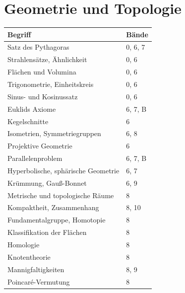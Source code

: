 \section*{Geometrie und Topologie}
\nopagebreak
{\small\renewcommand{\arraystretch}{1.32}
\begin{longtable}{@{}P{5.6cm}P{2.8cm}@{}}
\toprule
\textbf{Begriff} & \textbf{Bände}\\
\midrule
\endhead
Satz des Pythagoras & 0, 6, 7\\
Strahlensätze, Ähnlichkeit & 0, 6\\
Flächen und Volumina & 0, 6\\
Trigonometrie, Einheitskreis & 0, 6\\
Sinus- und Kosinussatz & 0, 6\\
Euklids Axiome & 6, 7, B\\
Kegelschnitte & 6\\
Isometrien, Symmetriegruppen & 6, 8\\
Projektive Geometrie & 6\\
Parallelenproblem & 6, 7, B\\
Hyperbolische, sphärische Geometrie & 6, 7\\
Krümmung, Gauß-Bonnet & 6, 9\\
Metrische und topologische Räume & 8\\
Kompaktheit, Zusammenhang & 8, 10\\
Fundamentalgruppe, Homotopie & 8\\
Klassifikation der Flächen & 8\\
Homologie & 8\\
Knotentheorie & 8\\
Mannigfaltigkeiten & 8, 9\\
Poincaré-Vermutung & 8\\
\bottomrule
\end{longtable}}


